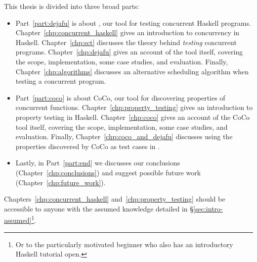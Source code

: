 This thesis is divided into three broad parts:

\begin{itemize}
\item Part~\ref{part:dejafu} is about \dejafu{}, our tool for testing concurrent Haskell programs.
  Chapter~\ref{chp:concurrent_haskell} gives an introduction to concurrency in Haskell.
  Chapter~\ref{chp:sct} discusses the theory behind \emph{testing} concurrent programs.
  Chapter~\ref{chp:dejafu} gives an account of the \dejafu{} tool itself, covering the scope,
  implementation, some case studies, and evaluation.  Finally, Chapter~\ref{chp:algorithms}
  discusses an alternative scheduling algorithm when testing a concurrent program.

\item Part~\ref{part:coco} is about CoCo, our tool for discovering properties of concurrent
  functions.  Chapter~\ref{chp:property_testing} gives an introduction to property testing in
  Haskell.  Chapter~\ref{chp:coco} gives an account of the CoCo tool itself, covering the scope,
  implementation, some case studies, and evaluation.  Finally, Chapter~\ref{chp:coco_and_dejafu}
  discusses using the properties discovered by CoCo as test cases in \dejafu{}.

\item Lastly, in Part~\ref{part:end} we discusses our conclusions (Chapter~\ref{chp:conclusions})
  and suggest possible future work (Chapter~\ref{chp:future_work}).
\end{itemize}

Chapters~\ref{chp:concurrent_haskell} and~\ref{chp:property_testing} should be accessible to anyone
with the assumed knowledge detailed in \S\ref{sec:intro-assumed}\footnote{Or to the particularly
  motivated beginner who also has an introductory Haskell tutorial open.}.
